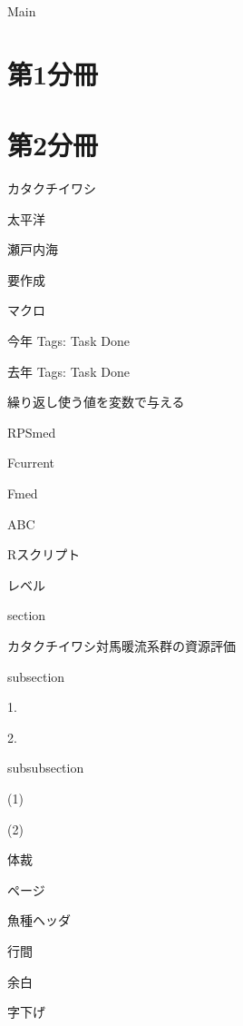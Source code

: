 Main

\part*{第1分冊}

\part*{第2分冊}

カタクチイワシ

太平洋



瀬戸内海

要作成

マクロ

今年
Tags: Task Done

去年
Tags: Task Done

繰り返し使う値を変数で与える


RPSmed


Fcurrent

Fmed

ABC

Rスクリプト

レベル

section

カタクチイワシ対馬暖流系群の資源評価

subsection

1.

2.

subsubsection

(1)

(2)

体裁

ページ

魚種ヘッダ

行間

余白

字下げ
